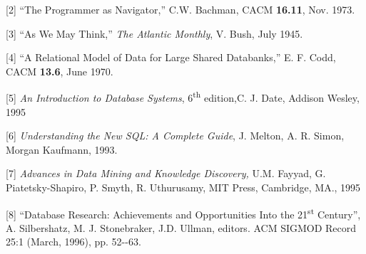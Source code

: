 \documentclass[a4paper,12pt,notitlepage,twoside,openright]{article}
\begin{document}
{[}2{]} ``The Programmer as Navigator,'' C.W. Bachman, CACM
\textbf{16.11}, Nov. 1973.

{[}3{]} ``As We May Think,'' \emph{The Atlantic Monthly}, V. Bush, July
1945.

{[}4{]} ``A Relational Model of Data for Large Shared Databanks,'' E. F.
Codd, CACM \textbf{13.6}, June 1970.

{[}5{]} \emph{An Introduction to Database Systems},
6\textsuperscript{th} edition,C. J. Date, Addison Wesley, 1995

{[}6{]} \emph{Understanding the New SQL: A Complete Guide}, J. Melton,
A. R. Simon, Morgan Kaufmann, 1993.

{[}7{]} \emph{Advances in Data Mining and Knowledge Discovery,} U.M.
Fayyad, G. Piatetsky-Shapiro, P. Smyth, R. Uthurusamy, MIT Press,
Cambridge, MA., 1995

{[}8{]} ``Database Research: Achievements and Opportunities Into the
21\textsuperscript{st} Century'', A. Silbershatz, M. J. Stonebraker,
J.D. Ullman, editors. ACM SIGMOD Record 25:1 (March, 1996), pp.
52-\/-63.
\end{document}
